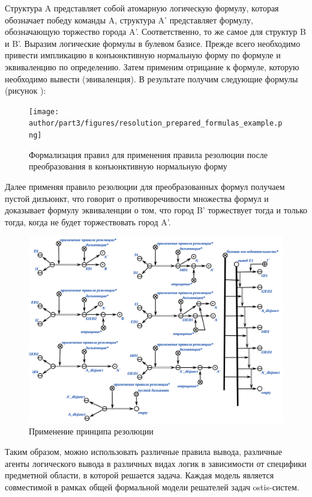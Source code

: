 Структура A представляет собой атомарную логическую формулу, которая обозначает победу команды A, структура A' представляет формулу, обозначающую торжество города A'. Соответственно, то же самое для структур B и B'.
Выразим логические формулы в булевом базисе. Прежде всего необходимо привести импликацию в конъюнктивную нормальную форму по формуле \textit{} и эквиваленцию по определению. Затем применим отрицание к формуле, которую необходимо вывести (эвиваленция). В результате получим следующие формулы (рисунок \textit{}):

\begin{figure}[H]
	\texttt{[image: author/part3/figures/resolution\_prepared\_formulas\_example.png]}
	\caption{Формализация правил для применения правила резолюции после преобразования в конъюнктивную нормальную форму}
	\label{fig:resolution_prepared_formulas}
\end{figure}

Далее применяя правило резолюции для преобразованных формул получаем пустой дизъюнкт, что говорит о противоречивости множества формул и доказывает формулу эквиваленции о том, что город B' торжествует тогда и только тогда, когда не будет торжествовать город A'.

\begin{figure}[H]
	\includegraphics[scale=0.7]{author/part3/figures/resolution_inference.png}
	\caption{Применение принципа резолюции}
	\label{fig:resolution_inference}
\end{figure}

Таким образом, можно использовать различные правила вывода, различные агенты логического вывода в различных видах логик в зависимости от специфики предметной области, в которой решается задача. Каждая модель является совместимой в рамках общей формальной модели решателей задач ostis-систем.

